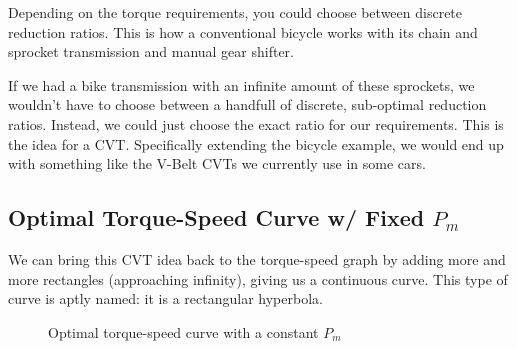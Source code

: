 \documentclass[12pt]{article}
\begin{document}
Depending on the torque requirements, you could choose between discrete reduction ratios. This is how a conventional bicycle works with its chain and sprocket transmission and manual gear shifter.

If we had a bike transmission with an infinite amount of these sprockets, we wouldn't have to choose between a handfull of discrete, sub-optimal reduction ratios. Instead, we could just choose the exact ratio for our requirements. This is the idea for a CVT. Specifically extending the bicycle example, we would end up with something like the V-Belt CVTs we currently use in some cars. 

\subsection{\texorpdfstring{Optimal Torque-Speed Curve w/ Fixed $P_{m}$}{PDFstring}}

We can bring this CVT idea back to the torque-speed graph by adding more and more rectangles (approaching infinity), giving us a continuous curve. This type of curve is aptly named: it is a rectangular hyperbola.

\begin{figure}[H]
  \centering
    \caption{Optimal torque-speed curve with a constant $P_{m}$}\label{fig:optimal_power_curve}
\end{figure}
\end{document}
